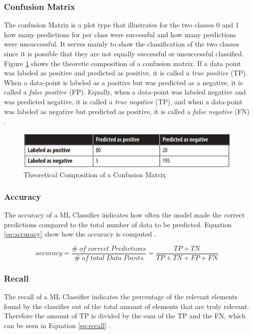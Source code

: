 \subsubsection{Confusion Matrix}
The confusion Matrix is a plot type that illustrates for the two classes 0 and 1 how many predictions for per class were successful and how many predictions were unsuccessful. It serves mainly to show the classification of the two classes since it is possible that they are not equally successful or unsuccessful classified. Figure \ref{fig:ex_conf_mat} shows the theoretic composition of a confusion matrix. If a data point was labeled as positive and predicted as positive, it is called a \textit{true positive} (TP). When a data-point is labeled as a positive but was predicted as a negative, it is called a \textit{false positive} (FP). Equally, when a data-point was labeled negative and was predicted negative, it is called a \textit{true negative} (TP), and when a data-point was labeled as negative but predicted as positive, it is called a \textit{false negative} (FN) \cite{Zheng2015EvaluatingML}. 

\begin{figure} [h]
    \centering
    \includegraphics[scale=0.7]{images/ex_conf_mat.PNG}
    \caption{Theoretical Composition of a Confusion Matrix \cite{Zheng2015EvaluatingML}}
    \label{fig:ex_conf_mat}
\end{figure}

\subsubsection{Accuracy}
The accuracy of a ML Classifier indicates how often the model made the correct predictions compared to the total number of data to be predicted. Equation \ref{eq:accuracy} show how the accuracy is computed \cite{Zheng2015EvaluatingML}.

\begin{equation}
    accuracy = \frac{\# \; of \; correct \; Predictions}{\# \; of \; total \; Data \; Points}  = \frac{TP+TN}{TP+TN+FP+FN}
    \label{eq:accuracy}
\end{equation}

\subsubsection{Recall}
The recall of a ML Classifier indicates the percentage of the relevant elements found by the classifier out of the total amount of elements that are truly relevant. Therefore the amount of TP is divided by the sum of the TP and the FN, which can be seen in Equation \ref{eq:recall} \cite{Zheng2015EvaluatingML}.

